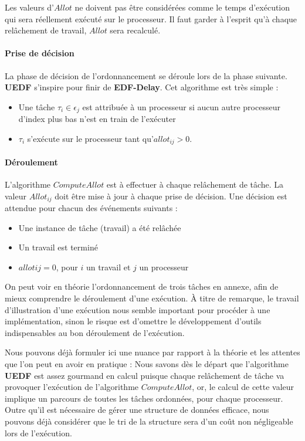 	Les valeurs d'$Allot$ ne doivent pas être considérées comme le temps d'exécution qui sera réellement 
	exécuté sur le processeur. Il faut garder à l'esprit qu'à chaque relâchement de travail, 
	$Allot$ sera recalculé. 

	\paragraph{Prise de décision}
	La phase de décision de l'ordonnancement se déroule lors de la phase suivante.
	\textbf{UEDF} s'inspire pour finir de \textbf{EDF-Delay}. 
	Cet algorithme est très simple :
	\begin{itemize}
		\setlength\itemsep{0.1em}
		\item Une tâche $\tau_i \in \epsilon_j$ est attribuée à un processeur si aucun autre processeur d'index plus bas n'est en train de l'exécuter
		\item $\tau_i$ s'exécute sur le processeur tant qu'$allot_{ij} > 0$.
	\end{itemize}


	\paragraph{Déroulement}
	L'algorithme $Compute Allot$ est à effectuer à chaque relâchement de tâche. La valeur $Allot_{ij}$ 
	doit être mise à jour à chaque prise de décision. Une décision est attendue pour chacun des événements suivants :\\
	\begin{itemize}
		\setlength\itemsep{0.1em}
		\item Une instance de tâche (travail) a été relâchée
		\item Un travail est terminé
		\item $allot{ij} = 0$, pour $i$ un travail et $j$ un processeur 
	\end{itemize}
	
	On peut voir en théorie l'ordonnancement de trois tâches en annexe, afin de mieux comprendre le déroulement d'une exécution.
	À titre de remarque, le travail d'illustration d'une exécution nous semble 
	important pour procéder à une implémentation, sinon le risque est d'omettre le développement 
	d'outils indispensables au bon déroulement de l'exécution.
	\newline
	
	Nous pouvons déjà formuler ici une nuance par rapport à la théorie et les attentes que l'on peut en avoir 
	en pratique : 
	Nous savons dès le départ que l'algorithme \textbf{UEDF} est assez gourmand en calcul puisque chaque relâchement de 
	tâche va provoquer l'exécution de l'algorithme $Compute Allot$, or, le calcul de cette valeur 
	implique un parcours de toutes les tâches ordonnées, pour chaque processeur. 
	Outre qu'il est nécessaire de gérer une structure de données efficace, nous pouvons 
	déjà considérer que le tri de la structure sera d'un coût non négligeable lors de l'exécution. \newline
	

